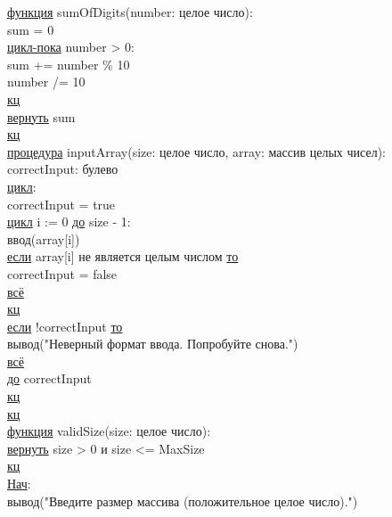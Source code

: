 \noindent
\underline{функция} sumOfDigits(number: целое число):\\
\null\qquad sum = 0\\
\null\qquad \underline{цикл-пока} number > 0:\\
\null\qquad \qquad sum += number \% 10\\
\null\qquad \qquad number /= 10\\
\null\qquad \underline{кц}\\
\null\qquad \underline{вернуть} sum\\
\underline{кц}\\

\noindent \underline{процедура} inputArray(size: целое число, array: массив целых чисел):\\
\null\qquad correctInput: булево\\
\null\qquad \underline{цикл}:\\
\null\qquad \qquad correctInput = true\\
\null\qquad \qquad \underline{цикл} i := 0 \underline{до} size - 1:\\
\null\qquad \qquad \qquad ввод(array[i])\\
\null\qquad \qquad \qquad \underline{если} array[i] не является целым числом \underline{то}\\
\null\qquad \qquad \qquad \qquad correctInput = false\\
\null\qquad \qquad \qquad \underline{всё}\\
\null\qquad \qquad \underline{кц}\\
\null\qquad \qquad \underline{если} !correctInput \underline{то}\\
\null\qquad \qquad \qquad вывод("Неверный формат ввода. Попробуйте снова.")\\
\null\qquad \qquad \underline{всё}\\
\null\qquad \underline{до} correctInput\\
\null\qquad \underline{кц}\\
\underline{кц}\\

\noindent
\underline{функция} validSize(size: целое число):\\
\null\qquad \underline{вернуть} size > 0 и size <= MaxSize\\
\underline{кц}\\

\noindent
\underline{Нач}:\\
\null\qquad вывод("Введите размер массива (положительное целое число).")\\


